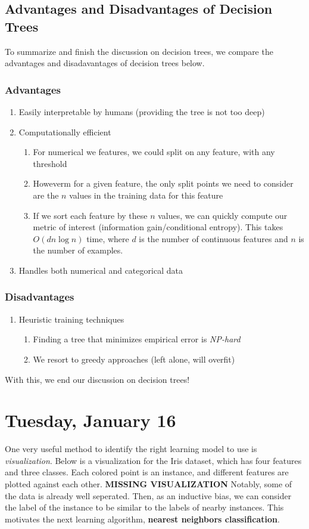 \documentclass[11 pt]{scrartcl}
\begin{document}
\subsection{Advantages and Disadvantages of Decision Trees}
To summarize and finish the discussion on decision trees, we compare the advantages and disadavantages of decision trees below.
\subsubsection{Advantages} 
\begin{enumerate}
  \item Easily interpretable by humans (providing the tree is not too deep)
  \item Computationally efficient
    \begin{enumerate}
      \item For numerical we features, we could split on any feature, with any threshold
      \item Howeverm for a given feature, the only split points we need to consider are the $n$ values in the training data for this feature
      \item If we sort each feature by these $n$ values, we can quickly compute our metric of interest (information gain/conditional entropy). This takes $O(dn \log n)$ time, where $d$ is the number of continuous features and $n$ is the number of examples.
    \end{enumerate}
  \item Handles both numerical and categorical data
\end{enumerate}
\subsubsection{Disadvantages}
\begin{enumerate}
   \item Heuristic training techniques
     \begin{enumerate} 
       \item Finding a tree that minimizes empirical error is \emph{NP-hard} 
       \item We resort to greedy approaches (left alone, will overfit)
     \end{enumerate}
\end{enumerate}
With this, we end our discussion on decision trees!
\newpage
\section{Tuesday, January 16}
One very useful method to identify the right learning model to use is \textit{visualization}. Below is a visualization for the Iris dataset, which has four features and three classes. Each colored point is an instance, and different features are plotted against each other. 
\textbf{MISSING VISUALIZATION}
Notably, some of the data is already well seperated. Then, as an inductive bias, we can consider the label of the instance to be similar to the labels of nearby instances. This motivates the next learning algorithm, \textbf{nearest neighbors classification}.
\end{document}
